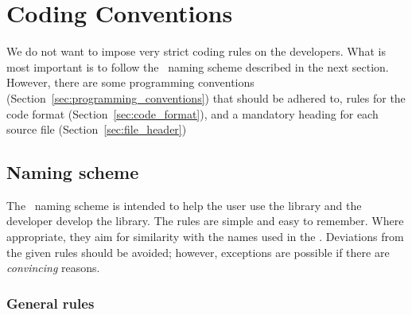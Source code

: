 

\chapter{Coding Conventions\label{chap:code_format}}


We do not want to impose very strict coding rules on the developers.
What is most important is to follow the \cgal\ naming scheme
described in the next section. However, there are some programming conventions
(Section~\ref{sec:programming_conventions}) that should be adhered to,
rules for the code format
(Section~\ref{sec:code_format}), and a mandatory heading for each
source file (Section~\ref{sec:file_header})


\section{Naming scheme\label{sec:naming_scheme}}

The \cgal\ naming scheme is intended to help the user
use the library and the developer develop the
library. The rules are simple and easy to remember. Where appropriate,
they aim for similarity with the names used in the \stl. Deviations from the
given rules should be avoided; however, exceptions are possible if
there are \emph{convincing} reasons.

\subsection*{General rules}

